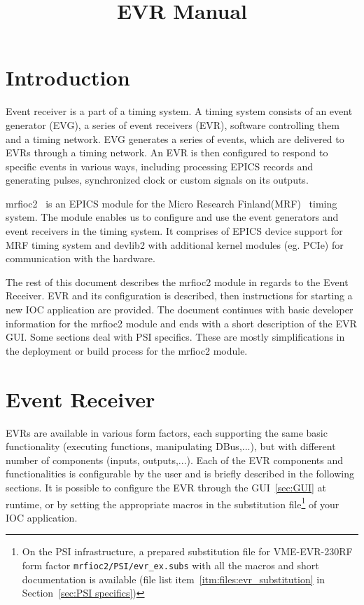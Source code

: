 \documentclass[12pt,a4paper]{article}
\title{EVR Manual}
\let\stdsection\section
\renewcommand\section{\newpage\stdsection}
\begin{document}
\maketitle


\tableofcontents


\section{Introduction}\label{sec:Introduction}
Event receiver is a part of a timing system. A timing system consists of an event generator (EVG), a series of event receivers (EVR), software controlling them and a timing network. EVG generates a series of events, which are delivered to EVRs through a timing network. An EVR is then configured to respond to specific events in various ways, including processing EPICS records and generating pulses, synchronized clock or custom signals on its outputs.

mrfioc2~\cite{mrfioc2} is an EPICS module for the Micro Research Finland(MRF)~\cite{mrf} timing system. The module enables us to configure and use the event generators and event receivers in the timing system. It comprises of EPICS device support for MRF timing system and devlib2 with additional kernel modules (eg. PCIe) for communication with the hardware.

The rest of this document describes the mrfioc2 module in regards to the Event Receiver. EVR and its configuration is described, then instructions for starting a new IOC application are provided. The document continues with basic developer information for the mrfioc2 module and ends with a short description of the EVR GUI. Some sections deal with PSI specifics. These are mostly simplifications in the deployment or build process for the mrfioc2 module.

\section{Event Receiver}\label{sec:Event Receiver}
EVRs are available in various form factors, each supporting the same basic functionality (executing functions, manipulating DBus,...), but with different number of components (inputs, outputs,...). Each of the EVR components and functionalities is configurable by the user and is briefly described in the following sections. It is possible to configure the EVR through the GUI~\ref{sec:GUI} at runtime, or by setting the appropriate macros in the substitution file\footnote{On the PSI infrastructure, a prepared substitution file for VME-EVR-230RF form factor \texttt{mrfioc2/PSI/evr\_ex.subs} with all the macros and short documentation is available (file list item~\ref{itm:files:evr_substitution} in Section~\ref{sec:PSI specifics})} of your IOC application.
\end{document}
